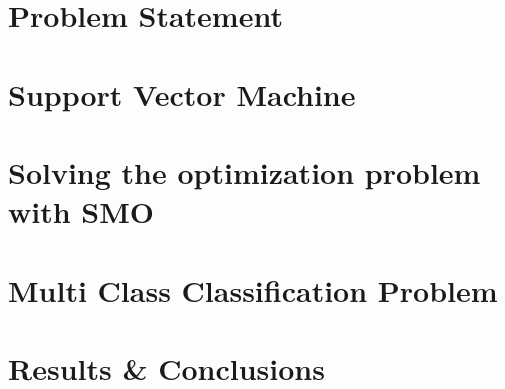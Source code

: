 \documentclass[12pt, a4paper, openany]{report} %
\theoremstyle{definition}
\numberwithin{equation}{chapter}
\begin{document}
\cleardoublepage
  \pagestyle{plain}

\chapter*{Problem Statement}




\chapter*{Support Vector Machine}




\chapter*{Solving the optimization problem with SMO}



\chapter{Multi Class Classification Problem}



\chapter{Results \& Conclusions}



  

%  
\end{document}
